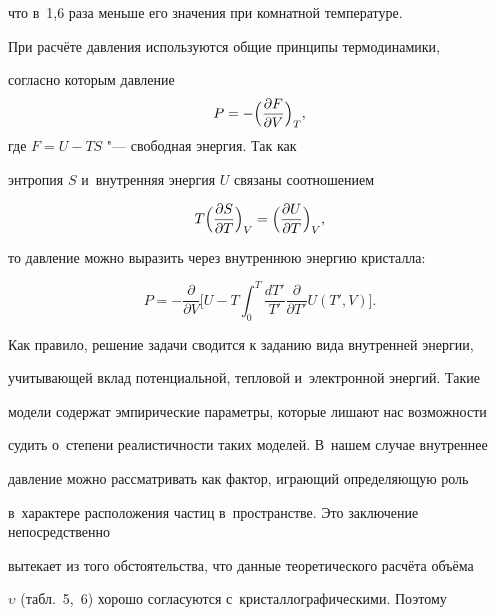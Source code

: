 что в~1,6 раза меньше его значения при комнатной температуре.




При расчёте давления используются общие принципы термодинамики, 

согласно которым давление $$P = - \Bigl( \frac {\partial F}{\partial  V}\Bigr)_T,$$ где $F=U-TS$ "--- свободная энергия. Так как 

энтропия $S$ и~внутренняя энергия $U$ связаны соотношением

\begin{equation}

\label{eq16}

T\Bigl( \frac{\partial S}{\partial T} \Bigr)_V =\Bigl( \frac{\partial 

U}{\partial T} \Bigr)_V ,

\end{equation}

то давление можно выразить через внутреннюю энергию кристалла:

\begin{equation}

\label{eq17}

P=-\frac{\partial }{\partial V}

\Biggl[ 

U-T\int_0^T \frac{d{T}'}{{T}'}\frac{\partial }{\partial T'}U(T', V) 

 \Biggr].

\end{equation}



Как правило, решение задачи сводится к заданию вида внутренней энергии, 

учитывающей вклад потенциальной, тепловой и~электронной энергий. Такие 

модели содержат эмпирические параметры, которые лишают нас возможности 

судить о~степени реалистичности таких моделей. В~нашем случае внутреннее 

давление можно рассматривать как фактор, играющий определяющую роль 

в~характере расположения частиц в~пространстве. Это заключение непосредственно 

вытекает из того обстоятельства, что данные теоретического расчёта объёма 

$\upsilon$ (табл.~5,~6) хорошо согласуются с~кристаллографическими. Поэтому 

